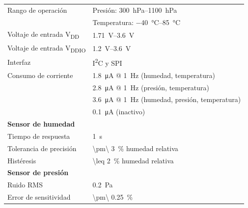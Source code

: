 \documentclass[../main]{subfiles}
\begin{document}
\begin{table}[H]
	\centering
	\begin{tabularx}{0.9\textwidth}{l X}
		\toprule
		Rango de operación                       & Presión: \qtyrange{300}{1100}{\hecto\Pa}                           \\
		                                         & Temperatura: \qtyrange{-40}{85}{\degreeCelsius}                    \\
		\midrule
		Voltaje de entrada V\textsubscript{DD}   & \qtyrange{1.71}{3.6}{\V}                                           \\
		Voltaje de entrada V\textsubscript{DDIO} & \qtyrange{1.2}{3.6}{\V}                                            \\
		\midrule
		Interfaz                                 & I\textsuperscript{2}C y SPI                                        \\
		\midrule
		Consumo de corriente                     & \qty{1.8}{\micro\A} @ \qty{1}{\Hz} (humedad, temperatura)          \\
		                                         & \qty{2.8}{\micro\A} @ \qty{1}{\Hz} (presión, temperatura)          \\
		                                         & \qty{3.6}{\micro\A} @ \qty{1}{\Hz} (humedad, presión, temperatura) \\
		                                         & \qty{0.1}{\micro\A} (inactivo)                                     \\
		\midrule
		\textbf{Sensor de humedad}               &                                                                    \\
		Tiempo de respuesta                      & \qty{1}{\s}                                                        \\
		Tolerancia de precisión                  & \qty[parse-numbers=false]{\pm\ 3}{\percent} humedad relativa       \\
		Histéresis                               & \qty[parse-numbers=false]{\leq 2}{\percent} humedad relativa       \\
		\midrule
		\textbf{Sensor de presión}               &                                                                    \\
		Ruido RMS                                & \qty{0.2}{\Pa}                                                     \\
		Error de sensitividad                    & \qty[parse-numbers=false]{\pm\ 0.25}{\percent}                     \\

\end{tabularx}
\end{table}
\end{document}
